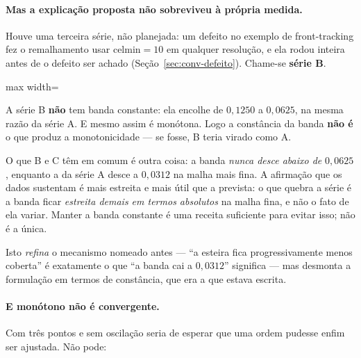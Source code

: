 \paragraph{Mas a explica\c{c}\~ao proposta n\~ao sobreviveu \`a pr\'opria
medida.} Houve uma terceira s\'erie, n\~ao planejada: um defeito no exemplo de
front-tracking fez o remalhamento usar $\text{celmin}=10$ em qualquer
resolu\c{c}\~ao, e ela rodou inteira antes de o defeito ser achado
(Se\c{c}\~ao~\ref{sec:conv-defeito}). Chame-se \textbf{s\'erie B}.

\begin{adjustbox}{max width=\linewidth}
\end{adjustbox}

A s\'erie B \textbf{n\~ao} tem banda constante: ela encolhe de $0{,}1250$ a
$0{,}0625$, na mesma raz\~ao da s\'erie A. E mesmo assim \'e mon\'otona. Logo a
constância da banda \textbf{n\~ao \'e} o que produz a monotonicidade --- se fosse,
B teria virado como A.

O que B e C t\^em em comum \'e outra coisa: a banda \emph{nunca desce abaixo de}
$0{,}0625$, enquanto a da s\'erie A desce a $0{,}0312$ na malha mais fina. A
afirma\c{c}\~ao que os dados sustentam \'e mais estreita e mais \'util que a
prevista: o que quebra a s\'erie \'e a banda ficar \emph{estreita demais em termos
absolutos} na malha fina, e n\~ao o fato de ela variar. Manter a banda constante
\'e uma receita suficiente para evitar isso; n\~ao \'e a \'unica.

Isto \emph{refina} o mecanismo nomeado antes --- ``a esteira fica
progressivamente menos coberta'' \'e exatamente o que ``a banda cai a
$0{,}0312$'' significa --- mas desmonta a formula\c{c}\~ao em termos de
const\^ancia, que era a que estava escrita.

\paragraph{E mon\'otono n\~ao \'e convergente.} Com tr\^es pontos e sem oscila\c{c}\~ao
seria de esperar que uma ordem pudesse enfim ser ajustada. N\~ao pode:

